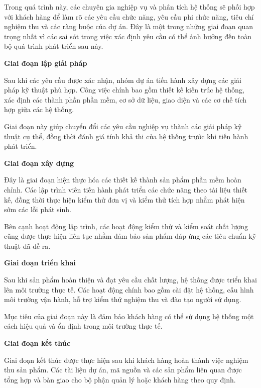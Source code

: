 \hspace{0.2cm}Trong quá trình này, các chuyên gia nghiệp vụ và phân tích hệ thống sẽ phối hợp với khách hàng để làm rõ các yêu cầu chức năng, yêu cầu phi chức năng, tiêu chí nghiệm thu và các ràng buộc của dự án. Đây là một trong những giai đoạn quan trọng nhất vì các sai sót trong việc xác định yêu cầu có thể ảnh hưởng đến toàn bộ quá trình phát triển sau này.

\textbf{Giai đoạn lập giải pháp}

\hspace{0.2cm}Sau khi các yêu cầu được xác nhận, nhóm dự án tiến hành xây dựng các giải pháp kỹ thuật phù hợp. Công việc chính bao gồm thiết kế kiến trúc hệ thống, xác định các thành phần phần mềm, cơ sở dữ liệu, giao diện và các cơ chế tích hợp giữa các hệ thống.

\hspace{0.2cm}Giai đoạn này giúp chuyển đổi các yêu cầu nghiệp vụ thành các giải pháp kỹ thuật cụ thể, đồng thời đánh giá tính khả thi của hệ thống trước khi tiến hành phát triển.

\textbf{Giai đoạn xây dựng}

\hspace{0.2cm}Đây là giai đoạn hiện thực hóa các thiết kế thành sản phẩm phần mềm hoàn chỉnh. Các lập trình viên tiến hành phát triển các chức năng theo tài liệu thiết kế, đồng thời thực hiện kiểm thử đơn vị và kiểm thử tích hợp nhằm phát hiện sớm các lỗi phát sinh.

\hspace{0.2cm}Bên cạnh hoạt động lập trình, các hoạt động kiểm thử và kiểm soát chất lượng cũng được thực hiện liên tục nhằm đảm bảo sản phẩm đáp ứng các tiêu chuẩn kỹ thuật đã đề ra.

\textbf{Giai đoạn triển khai}

\hspace{0.2cm}Sau khi sản phẩm hoàn thiện và đạt yêu cầu chất lượng, hệ thống được triển khai lên môi trường thực tế. Các hoạt động chính bao gồm cài đặt hệ thống, cấu hình môi trường vận hành, hỗ trợ kiểm thử nghiệm thu và đào tạo người sử dụng.

\hspace{0.2cm}Mục tiêu của giai đoạn này là đảm bảo khách hàng có thể sử dụng hệ thống một cách hiệu quả và ổn định trong môi trường thực tế.


\textbf{Giai đoạn kết thúc}

\hspace{0.2cm}Giai đoạn kết thúc được thực hiện sau khi khách hàng hoàn thành việc nghiệm thu sản phẩm. Các tài liệu dự án, mã nguồn và các sản phẩm liên quan được tổng hợp và bàn giao cho bộ phận quản lý hoặc khách hàng theo quy định.

